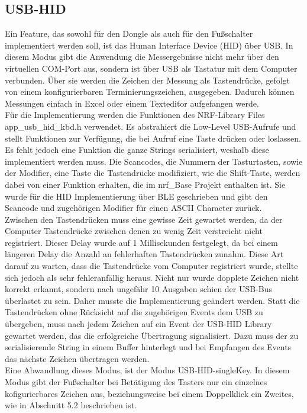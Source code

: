 \subsection{USB-HID}
Ein Feature, das sowohl für den Dongle als auch für den Fußschalter implementiert werden soll, ist das Human Interface Device (HID) über USB. In diesem Modus gibt die Anwendung die Messergebnisse nicht mehr über den virtuellen COM-Port aus, sondern ist über USB als Tastatur mit dem Computer verbunden. Über sie werden die Zeichen der Messung als Tastendrücke, gefolgt von einem konfigurierbaren Terminierungszeichen, ausgegeben. Dadurch können Messungen einfach in Excel oder einem Texteditor aufgefangen werde.\\
Für die Implementierung werden die Funktionen des NRF-Library Files app\_usb\_hid\_kbd.h verwendet. Es abstrahiert die Low-Level USB-Aufrufe und stellt Funktionen zur Verfügung, die bei Aufruf eine Taste drücken oder loslassen. Es fehlt jedoch eine Funktion die ganze Strings serialisiert, weshalb diese implementiert werden muss. Die Scancodes, die Nummern der Tasturtasten, sowie der Modifier, eine Taste die Tastendrücke modifiziert, wie die Shift-Taste, werden dabei von einer Funktion erhalten, die im nrf\_Base Projekt enthalten ist. Sie wurde für die \ac{HID} Implementierung über \ac{BLE} geschrieben und gibt den Scancode und zugehörigen Modifier für einen ASCII Character zurück.\\
Zwischen den Tastendrücken muss eine gewisse Zeit gewartet werden, da der Computer Tastendrücke zwischen denen zu wenig Zeit verstreicht nicht registriert. Dieser Delay wurde auf 1 Millisekunden festgelegt, da bei einem längeren Delay die Anzahl an fehlerhaften Tastendrücken zunahm. Diese Art darauf zu warten, dass die Tastendrücke vom Computer registriert wurde, stellte sich jedoch als sehr fehleranfällig heraus. Nicht nur wurde dopplete Zeichen nicht korrekt erkannt, sondern nach ungefähr 10 Ausgaben schien der USB-Bus überlastet zu sein. Daher musste die Implementierung geändert werden. Statt die Tastendrücken ohne Rücksicht auf die zugehörigen Events dem USB zu übergeben, muss nach jedem Zeichen auf ein Event der USB-\ac{HID} Library gewartet werden, das die erfolgreiche Übertragung signalisiert. Dazu muss der zu serialisierende String in einem Buffer hinterlegt und bei Empfangen des Events das nächste Zeichen übertragen werden.\\
Eine Abwandlung dieses Modus, ist der Modus USB-\ac{HID}-singleKey. In diesem Modus gibt der Fußschalter bei Betätigung des Tasters nur ein einzelnes kofigurierbares Zeichen aus, beziehungsweise bei einem Doppelklick ein Zweites, wie in Abschnitt 5.2 beschrieben ist.


